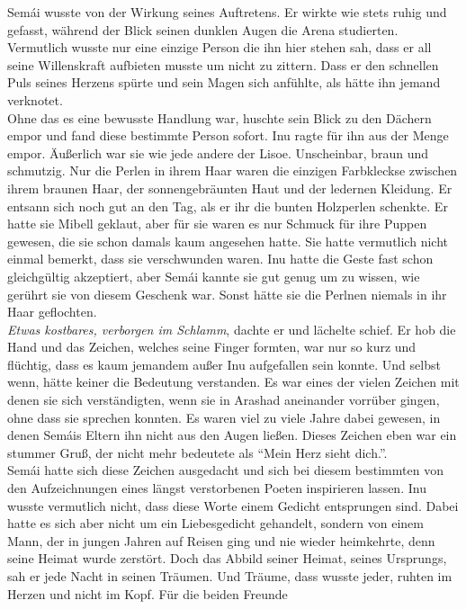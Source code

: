 Semái wusste von der Wirkung seines Auftretens. Er wirkte wie stets ruhig und gefasst, während der 
Blick seinen dunklen Augen die Arena studierten. Vermutlich wusste nur eine einzige Person die ihn 
hier stehen sah, dass er all seine Willenskraft aufbieten musste um nicht zu zittern. Dass er den 
schnellen Puls seines Herzens spürte und sein Magen sich anfühlte, als hätte ihn jemand 
verknotet.\\
Ohne das es eine bewusste Handlung war, huschte sein Blick zu den Dächern empor und fand diese 
bestimmte Person sofort. Inu ragte für ihn aus der Menge empor. Äußerlich war sie wie jede andere 
der Lisoe. Unscheinbar, braun und schmutzig. Nur die Perlen in ihrem Haar waren die einzigen 
Farbkleckse zwischen ihrem braunen Haar, der sonnengebräunten Haut und der ledernen Kleidung. Er 
entsann sich noch gut an den Tag, als er ihr die bunten Holzperlen schenkte. Er hatte sie Mibell 
geklaut, aber für sie waren es nur Schmuck für ihre Puppen gewesen, die sie schon damals kaum 
angesehen hatte. Sie hatte vermutlich nicht einmal bemerkt, dass sie verschwunden waren. Inu hatte 
die Geste fast schon gleichgültig akzeptiert, aber Semái kannte sie gut genug um zu wissen, wie 
gerührt sie von diesem Geschenk war. Sonst hätte sie die Perlnen niemals in ihr Haar geflochten.\\
\textit{Etwas kostbares, verborgen im Schlamm}, dachte er und lächelte schief.
Er hob die Hand und das Zeichen, welches seine Finger formten, war nur so kurz und flüchtig, dass 
es kaum jemandem außer Inu aufgefallen sein konnte. Und selbst wenn, hätte keiner die Bedeutung 
verstanden. Es war eines der vielen Zeichen mit denen sie sich verständigten, wenn sie in Arashad 
aneinander vorrüber gingen, ohne dass sie sprechen konnten. Es waren viel zu viele Jahre dabei 
gewesen, in denen Semáis Eltern ihn nicht aus den Augen ließen. Dieses Zeichen eben war ein stummer 
Gruß, der nicht mehr bedeutete als ``Mein Herz sieht dich.''. \\
Semái hatte sich diese Zeichen ausgedacht und sich bei diesem bestimmten von den Aufzeichnungen 
eines längst verstorbenen Poeten inspirieren lassen. Inu wusste vermutlich nicht, dass diese Worte 
einem Gedicht entsprungen sind. Dabei hatte es sich aber nicht um ein Liebesgedicht gehandelt, 
sondern von einem Mann, der in jungen Jahren auf Reisen ging und nie wieder heimkehrte, denn seine 
Heimat wurde zerstört. Doch das Abbild seiner Heimat, seines Ursprungs, sah er jede Nacht in seinen 
Träumen. Und Träume, dass wusste jeder, ruhten im Herzen und nicht im Kopf. Für die beiden Freunde 
